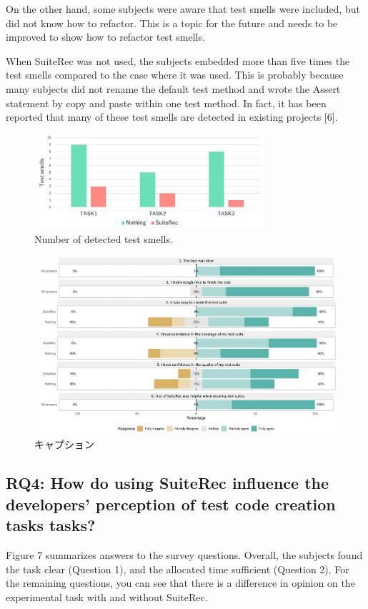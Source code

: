 \documentclass[conference]{IEEEtran}
\begin{document}
On the other hand, some subjects were aware that test smells were included, but did not know how to refactor. This is a topic for the future and needs to be improved to show how to refactor test smells.

When SuiteRec was not used, the subjects embedded more than five times the test smells compared to the case where it was used. This is probably because many subjects did not rename the default test method and wrote the Assert statement by copy and paste within one test method. In fact, it has been reported that many of these test smells are detected in existing projects [6].


\begin{figure}[htbp]
\centerline{\includegraphics[width=8.5cm]{smells.pdf}}
\caption{Number of detected test smells.}
\label{fig}
\end{figure}

\begin{figure}[t]
 \begin{center}
  \includegraphics[width=18.5cm]{suiterec-expt.pdf}
  \caption{キャプション}
  \label{}
 \end{center}
\end{figure}

\subsection{RQ4: How do using SuiteRec influence the developers’ perception of test code creation tasks tasks?}
Figure 7 summarizes answers to the survey questions. Overall, the subjects found the task clear (Question 1), and the allocated time sufficient (Question 2). For the remaining questions, you can see that there is a difference in opinion on the experimental task with and without SuiteRec. 
\end{document}
